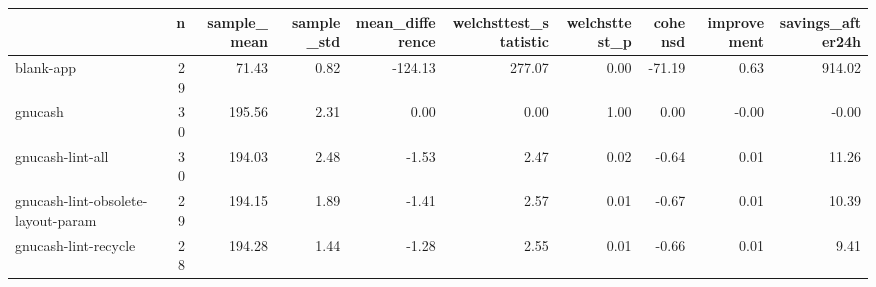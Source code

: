 \begin{tabular}{lrrrrrrrrr}
\toprule
{} &   n &  sample\_mean &  sample\_std &  mean\_difference &  welchsttest\_statistic &  welchsttest\_p &  cohensd &  improvement &  savings\_after24h \\
\midrule
blank-app                          &  29 &        71.43 &        0.82 &          -124.13 &                 277.07 &           0.00 &   -71.19 &         0.63 &            914.02 \\
gnucash                            &  30 &       195.56 &        2.31 &             0.00 &                   0.00 &           1.00 &     0.00 &        -0.00 &             -0.00 \\
gnucash-lint-all                   &  30 &       194.03 &        2.48 &            -1.53 &                   2.47 &           0.02 &    -0.64 &         0.01 &             11.26 \\
gnucash-lint-obsolete-layout-param &  29 &       194.15 &        1.89 &            -1.41 &                   2.57 &           0.01 &    -0.67 &         0.01 &             10.39 \\
gnucash-lint-recycle               &  28 &       194.28 &        1.44 &            -1.28 &                   2.55 &           0.01 &    -0.66 &         0.01 &              9.41 \\
\bottomrule
\end{tabular}
